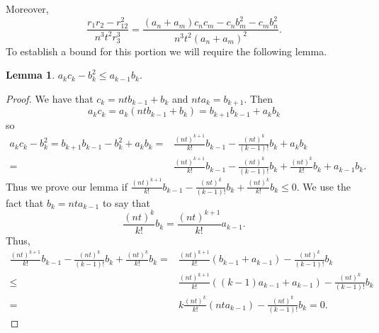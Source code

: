 \documentclass[12pt]{amsart}
\newtheorem{lemma}[theorem]{Lemma}
\theoremstyle{remark}
\begin{document}
Moreover,
\[\frac{r_1r_2-r_{12}^2}{n^3t^2r_3^3}=\frac{(a_n+a_m)c_nc_m-c_nb_m^2-c_mb_n^2}{n^3t^2(a_n+a_m)^2}.\]
To establish a bound for this portion we will require the following lemma.
\begin{lemma}\label{ac-b2}
$a_kc_k-b_k^2\le a_{k-1}b_k$.
\end{lemma}
\begin{proof}
We have that $c_k=ntb_{k-1}+b_k$ and $nta_k=b_{k+1}$.  Then
\[a_kc_k=a_k(ntb_{k-1}+b_k)=b_{k+1}b_{k-1}+a_kb_k\]
so
\begin{align*}a_kc_k-b_k^2=b_{k+1}b_{k-1}-b_k^2+a_kb_k=&\frac{(nt)^{k+1}}{k!}b_{k-1}-\frac{(nt)^{k}}{(k-1)!}b_k+a_kb_k
\\=&\frac{(nt)^{k+1}}{k!}b_{k-1}-\frac{(nt)^{k}}{(k-1)!}b_k+\frac{(nt)^k}{k!}b_k+a_{k-1}b_k.
\end{align*}
Thus we prove our lemma if $\frac{(nt)^{k+1}}{k!}b_{k-1}-\frac{(nt)^{k}}{(k-1)!}b_k+\frac{(nt)^k}{k!}b_k\le0$.  We use the fact that $b_k=nta_{k-1}$ to say that
\[\frac{(nt)^k}{k!}b_k=\frac{(nt)^{k+1}}{k!}a_{k-1}.\]
Thus,
\begin{align*}\frac{(nt)^{k+1}}{k!}b_{k-1}-\frac{(nt)^{k}}{(k-1)!}b_k+\frac{(nt)^k}{k!}b_k=&\frac{(nt)^{k+1}}{k!}(b_{k-1}+a_{k-1})-\frac{(nt)^{k}}{(k-1)!}b_k
\\\le&\frac{(nt)^{k+1}}{k!}((k-1)a_{k-1}+a_{k-1})-\frac{(nt)^{k}}{(k-1)!}b_k
\\=&k\frac{(nt)^{k}}{k!}(nta_{k-1})-\frac{(nt)^{k}}{(k-1)!}b_k=0.
\end{align*}
\end{proof}
\end{document}
